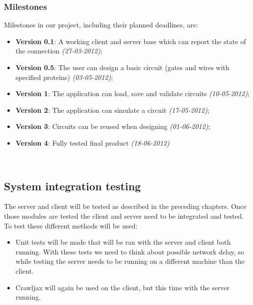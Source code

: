 \documentclass[a4paper]{article}
\begin{document}
\subsubsection{Milestones}
Milestones in our project, including their planned deadlines, are:
\begin{itemize}
\item \textbf{Version 0.1}: A working client and server base which can report the state of the connection \emph{(27-03-2012)};
\item \textbf{Version 0.5}: The user can design a basic circuit (gates and wires with specified proteins) \emph{(03-05-2012)};
\item \textbf{Version 1}: The application can load, save and validate circuits \emph{(10-05-2012)};
\item \textbf{Version 2}: The application can simulate a circuit \emph{(17-05-2012)};
\item \textbf{Version 3}: Circuits can be reused when designing \emph{(01-06-2012)};
\item \textbf{Version 4}: Fully tested final product \emph{(18-06-2012)}
\end{itemize}~\\




\subsection{System integration testing}
The server and client will be tested as described in the preceding chapters. Once those modules are tested the client and server need to be integrated and tested. To test these different methods will be used:\\
\begin{itemize}
\item Unit tests will be made that will be ran with the server and client both running. With these tests we need to think about possible network delay, so while testing the server needs to be running on a different machine than the client.
\item Crawljax will again be used on the client, but this time with the server running.\\
\end{itemize}

\end{document}

